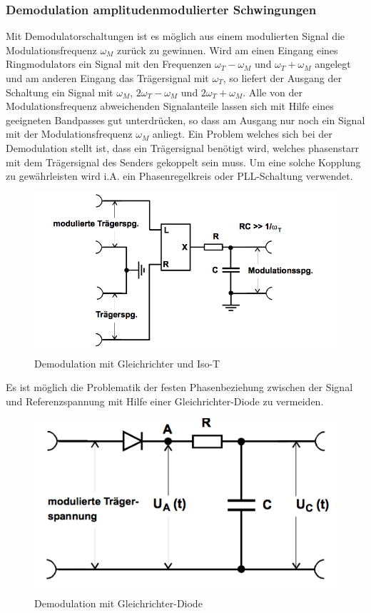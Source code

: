 \subsubsection{Demodulation amplitudenmodulierter Schwingungen}
Mit Demodulatorschaltungen ist es möglich aus einem modulierten Signal die Modulationsfrequenz $\omega_M$ zurück zu gewinnen.
Wird am einen Eingang eines Ringmodulators ein Signal mit den Frequenzen $\omega_T - \omega_M$ und $\omega_T + \omega_M$ angelegt und am anderen Eingang das Trägersignal mit $\omega_T$, so liefert der Ausgang der Schaltung ein Signal mit
$\omega_M$, $2\omega_T - \omega_M$ und $2\omega_T + \omega_M$. Alle von der Modulationsfrequenz abweichenden Signalanteile lassen sich mit Hilfe eines geeigneten Bandpasses gut unterdrücken, so dass am Ausgang nur noch ein Signal mit der Modulationsfrequenz $\omega_M$ anliegt. Ein Problem welches sich bei der Demodulation stellt ist, dass ein Trägersignal benötigt wird, welches phasenstarr mit dem Trägersignal des Senders gekoppelt sein muss. Um eine solche Kopplung zu gewährleisten wird i.A. ein Phasenregelkreis oder PLL-Schaltung verwendet. 

\begin{figure}
	\centering
	\includegraphics[width=\textwidth]{img/Abb8.png}
	\caption{Demodulation mit Gleichrichter und Iso-T \cite{FP}}
	\label{iso-t}
\end{figure}

Es ist möglich die Problematik der festen Phasenbeziehung zwischen der Signal und Referenzspannung mit Hilfe einer Gleichrichter-Diode 
zu vermeiden.

\begin{figure}
	\centering
	\includegraphics[width=\textwidth]{img/Abb9.png}
	\caption{Demodulation mit Gleichrichter-Diode \cite{FP}}
	\label{fig:9}
\end{figure}

